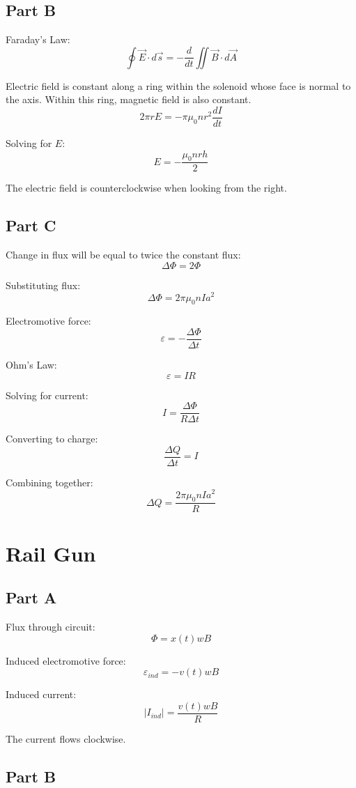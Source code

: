 \documentclass{article}
\begin{document}
\subsection*{Part B}

Faraday's Law:
$$ \oint \vec{E} \cdot d\vec{s} = -\frac{d}{dt}\iint \vec{B} \cdot d\vec{A} $$

Electric field is constant along a ring within the solenoid whose face is normal
to the axis. Within this ring, magnetic field is also constant.
$$ 2 \pi r E = - \pi \mu_0 n r^2 \frac{dI}{dt} $$

Solving for $E$:
$$ E = -\frac{\mu_0 n r h}{2} $$

The electric field is counterclockwise when looking from the right.

\subsection*{Part C}

Change in flux will be equal to twice the constant flux:
$$ \Delta \Phi = 2 \Phi $$

Substituting flux:
$$ \Delta \Phi = 2 \pi \mu_0 n I a^2 $$

Electromotive force:
$$ \varepsilon = -\frac{\Delta \Phi}{\Delta t} $$

Ohm's Law:
$$ \varepsilon = I R $$

Solving for current:
$$ I = \frac{\Delta \Phi}{R \Delta t} $$

Converting to charge:
$$ \frac{\Delta Q}{\Delta t} = I $$

Combining together:
$$ \Delta Q = \frac{2 \pi \mu_0 n I a^2}{R} $$

\section{Rail Gun}

\subsection*{Part A}

Flux through circuit:
$$ \Phi = x(t) w B $$

Induced electromotive force:
$$ \varepsilon_{ind} = - v(t) w B $$

Induced current:
$$ \vert I_{ind} \vert = \frac{v(t) w B}{R} $$

The current flows clockwise.

\subsection*{Part B}
\end{document}
